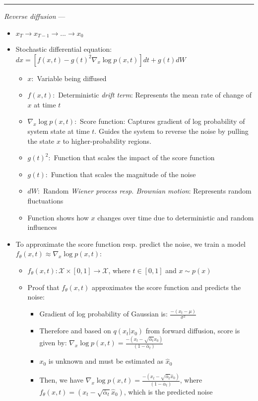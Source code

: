 {\color{lightgray}\hrule height 0.001mm}

\emph{Reverse diffusion} --- 
\begin{itemize}
    \item $x_T \rightarrow x_{T-1} \rightarrow ... \rightarrow x_0$
    \item Stochastic differential equation: $dx = [f(x,t) - g(t)^2 \nabla_x \log p(x,t)]dt + g(t) dW$
    \begin{itemize}
        \item $x:$ Variable being diffused
        \item $f(x,t):$ Deterministic \emph{drift term}: Represents the mean rate of change of $x$ at time $t$
        \item $\nabla_x \log p(x,t):$ Score function: Captures gradient of log probability of system state at time $t$. Guides the system to reverse the noise by pulling the state $x$ to higher-probability regions.
        \item $g(t)^2:$ Function that scales the impact of the score function
        \item $g(t):$ Function that scales the magnitude of the noise
        \item $dW:$ Random \emph{Wiener process resp. Brownian motion}: Represents random fluctuations
        \item Function shows how $x$ changes over time due to deterministic and random influences
    \end{itemize}
    \item To approximate the score function resp. predict the noise, we train a model $f_\theta(x,t) \approx \nabla_x \log p(x,t)$:
    \begin{itemize}
        \item $f_\theta(x,t): \mathcal{X} \times [0,1] \rightarrow \mathcal{X}$, where $t \in [0,1]$ and $x \sim p(x)$
        \item Proof that $f_\theta(x,t)$ approximates the score function and predicts the noise:
        \begin{itemize}
            \item Gradient of log probability of Gaussian is: $\frac{-(x_t - \mu)}{\sigma^2}$
            \item Therefore and based on $q(x_t | x_0)$ from forward diffusion, score is given by: $\nabla_x \log p(x,t) = \frac{-(x_t - \sqrt{\bar{\alpha}_t} x_0)}{(1-\bar{\alpha}_t)}$
            \item $x_0$ is unknown and must be estimated as $\hat{x}_0$
            \item Then, we have $\nabla_x \log p(x,t) = \frac{-(x_t - \sqrt{\bar{\alpha}_t} \hat{x}_0)}{(1-\bar{\alpha}_t)}$, where $f_\theta(x,t) = (x_t - \sqrt{\bar{\alpha}_t} \hat{x}_0)$, which is the predicted noise

\end{itemize}
\end{itemize}
\end{itemize}
